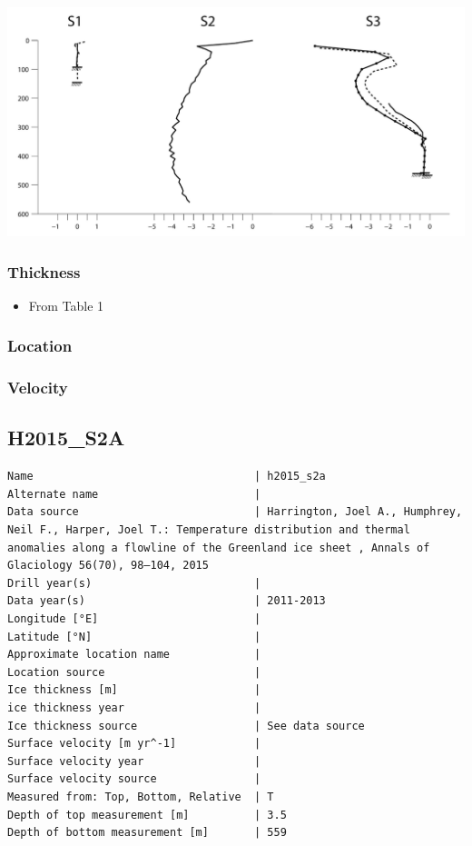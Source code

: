 \documentclass[article,a4paper,times,11pt,twoside]{article}
\begin{document}
\begin{center}
\includegraphics[width=.9\linewidth]{h2015_s1b/harrington_2015_fig2_S1_S2_S3.png}
\end{center}

\subsubsection{Thickness}
\label{sec:orgfd52152}

\begin{itemize}
\item From \textcite{harrington_2015} Table 1
\end{itemize}

\subsubsection{Location}
\label{sec:org02850bc}

\subsubsection{Velocity}
\label{sec:org31e06ff}
\clearpage
\subsection{H2015\_S2A}
\label{sec:org3699096}
\begin{verbatim}
Name                                  | h2015_s2a
Alternate name                        | 
Data source                           | Harrington, Joel A., Humphrey, Neil F., Harper, Joel T.: Temperature distribution and thermal anomalies along a flowline of the Greenland ice sheet , Annals of Glaciology 56(70), 98–104, 2015 
Drill year(s)                         | 
Data year(s)                          | 2011-2013
Longitude [°E]                        | 
Latitude [°N]                         | 
Approximate location name             | 
Location source                       | 
Ice thickness [m]                     | 
ice thickness year                    | 
Ice thickness source                  | See data source
Surface velocity [m yr^-1]            | 
Surface velocity year                 | 
Surface velocity source               | 
Measured from: Top, Bottom, Relative  | T
Depth of top measurement [m]          | 3.5
Depth of bottom measurement [m]       | 559
\end{verbatim}
\end{document}
